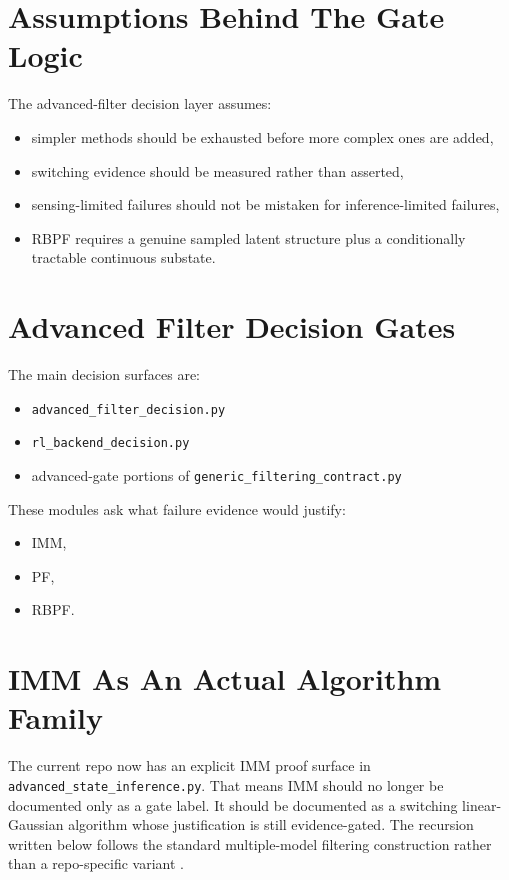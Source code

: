 \documentclass[11pt]{article}
\begin{document}
\section{Assumptions Behind The Gate Logic}

The advanced-filter decision layer assumes:
\begin{itemize}[leftmargin=1.5em]
    \item simpler methods should be exhausted before more complex ones are added,
    \item switching evidence should be measured rather than asserted,
    \item sensing-limited failures should not be mistaken for inference-limited failures,
    \item RBPF requires a genuine sampled latent structure plus a conditionally
    tractable continuous substate.
\end{itemize}

\section{Advanced Filter Decision Gates}

The main decision surfaces are:
\begin{itemize}[leftmargin=1.5em]
    \item \texttt{advanced\_filter\_decision.py}
    \item \texttt{rl\_backend\_decision.py}
    \item advanced-gate portions of \texttt{generic\_filtering\_contract.py}
\end{itemize}

These modules ask what failure evidence would justify:
\begin{itemize}[leftmargin=1.5em]
    \item IMM,
    \item PF,
    \item RBPF.
\end{itemize}

\section{IMM As An Actual Algorithm Family}

The current repo now has an explicit IMM proof surface in
\texttt{advanced\_state\_inference.py}. That means IMM should no longer be
documented only as a gate label. It should be documented as a switching
linear-Gaussian algorithm whose justification is still evidence-gated. The
recursion written below follows the standard multiple-model filtering
construction rather than a repo-specific variant \cite{barshalom2001}.
\end{document}
